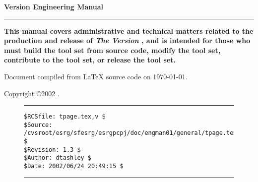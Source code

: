 
\thispagestyle{empty}
\vspace*{0.0cm}
\begin{flushright}
\Huge\bfseries
\tsname{} Version \tsversion{} Engineering Manual
\end{flushright}
\vspace{0.0cm}
\noindent\rule{\textwidth}{2pt}
\begin{flushright}
\Large\bfseries
This manual covers administrative and technical matters
related to the production and release of
\emph{The \tsname{} Version \tsversion{}}, and is
intended for those who must build the 
tool set from source code, modify the tool set,
contribute to the tool set, or release the tool set.
\end{flushright}
\vfill
\begin{flushright}
\begin{small}
\authors{}
\end{small}
\end{flushright}
\vspace{0.2cm}
\begin{flushright}
\begin{small}
Document compiled from \LaTeX{} source code on \today .
\end{small}
\end{flushright}
\vspace*{0.0cm}

\pagebreak
\thispagestyle{empty}
\begin{small}
  \noindent Copyright \copyright 2002 \authors{}.
\end{small}

\vfill

\noindent\begin{figure}[!b]
\noindent\rule[-0.25in]{\textwidth}{1pt}
\begin{tiny}
\begin{verbatim}
$RCSfile: tpage.tex,v $
$Source: /cvsroot/esrg/sfesrg/esrgpcpj/doc/engman01/general/tpage.tex,v $
$Revision: 1.3 $
$Author: dtashley $
$Date: 2002/06/24 20:49:15 $
\end{verbatim}
\end{tiny}
\noindent\rule[0.25in]{\textwidth}{1pt}
\end{figure}
%
%
%
%

